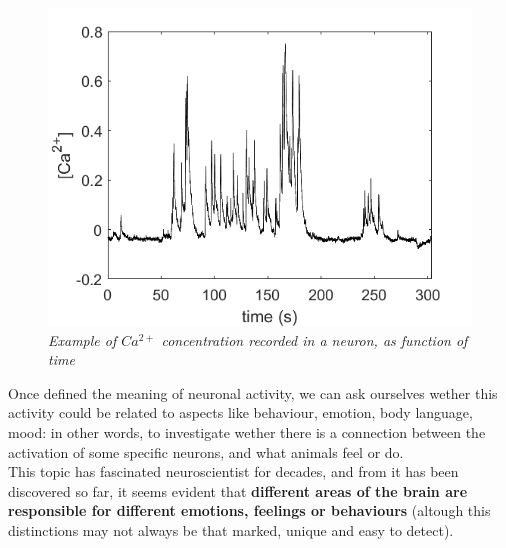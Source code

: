 \documentclass[a4paper]{article}
\begin{document}
\begin{figure}[H]
	\begin{center}
		\includegraphics[scale=.50]{Ca_conc.png} 
	\end{center} 
	\caption{\textit{Example of $Ca^{2+}$ concentration recorded in a neuron, as function of time}}
		
	\end{figure}
	
	Once defined the meaning of neuronal activity, we can ask ourselves wether this activity could be related to aspects like behaviour, emotion, body language, mood: in other words, to investigate wether there is a connection between the activation of some specific neurons, and what animals feel or do.\\
	This topic has fascinated neuroscientist for decades, and from it has been discovered so far, it seems evident that \textbf{different areas of the brain are responsible for different emotions, feelings or behaviours} (altough this distinctions may not always be that marked, unique and easy to detect).
\end{document}
